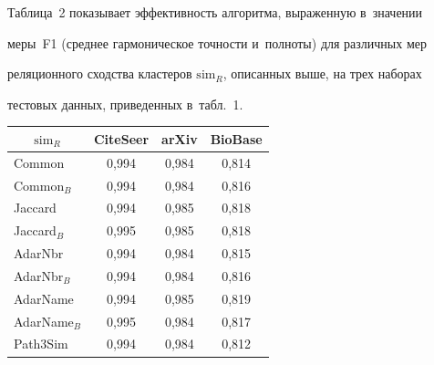   


  Таблица~2 показывает эффективность алгоритма, выраженную в~значении 


меры~F1 (среднее гармоническое точ\-ности и~полноты) для различных мер 


реляционного сходства клас\-те\-ров $\mathrm{sim}_R$, описанных выше, на трех наборах 


тес\-то\-вых данных, приведенных в~табл.~1.


  


  \begin{table}\small %


  \begin{center}


  \parbox{200pt}{


}





    \vspace*{2ex}


    


    \tabcolsep=7pt


    \begin{tabular}{|l|c|c|c|}


    \hline


\multicolumn{1}{|c|}{$\mathrm{sim}_R$}&CiteSeer&arXiv&BioBase\\


\hline


Common&0,994&0,984&0,814\\


Common$_B$&0,994&0,984&0,816\\


Jaccard&0,994&0,985&0,818\\


Jaccard$_B$&0,995&0,985&0,818\\


AdarNbr&0,994&0,984&0,815\\


AdarNbr$_B$&0,994&0,984&0,816\\


AdarName&0,994&0,985&0,819\\


AdarName$_B$&0,995&0,984&0,817\\


Path3Sim&0,994&0,984&0,812\\


\hline


\end{tabular}


\end{center}


\vspace*{-12pt}


\end{table}



